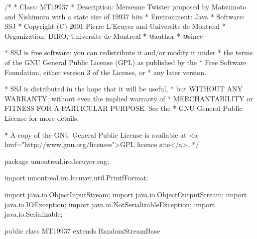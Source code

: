 \begin{code}
\begin{hide}
/*
 * Class:        MT19937
 * Description:  Mersenne Twister proposed by Matsumoto and Nishimura
                 with a state size of 19937 bits
 * Environment:  Java
 * Software:     SSJ
 * Copyright (C) 2001  Pierre L'Ecuyer and Universite de Montreal
 * Organization: DIRO, Universite de Montreal
 * @author
 * @since

 * SSJ is free software: you can redistribute it and/or modify it under
 * the terms of the GNU General Public License (GPL) as published by the
 * Free Software Foundation, either version 3 of the License, or
 * any later version.

 * SSJ is distributed in the hope that it will be useful,
 * but WITHOUT ANY WARRANTY; without even the implied warranty of
 * MERCHANTABILITY or FITNESS FOR A PARTICULAR PURPOSE.  See the
 * GNU General Public License for more details.

 * A copy of the GNU General Public License is available at
   <a href="http://www.gnu.org/licenses">GPL licence site</a>.
 */
\end{hide}
package umontreal.iro.lecuyer.rng;\begin{hide}

import umontreal.iro.lecuyer.util.PrintfFormat;

import java.io.ObjectInputStream;
import java.io.ObjectOutputStream;
import java.io.IOException;
import java.io.NotSerializableException;
import java.io.Serializable;\end{hide}

public class MT19937 extends RandomStreamBase \begin{hide} {

   private static final long serialVersionUID = 70510L;
   //La date de modification a l'envers, lire 10/05/2007

   private static final double NORM = 1.0 / 0x100000001L;   // 1/(2^32 + 1)

   private static final int N = 624;
   private static final int M = 397;
   private static final int[] MULT_MATRIX_A = {0x0, 0x9908B0DF};
   private static final int UPPER_MASK = 0x80000000;
   private static final int LOWER_MASK = 0x7FFFFFFF;

   private int[] state;
   private int state_i;

   private CloneableRandomStream seedRng;

   private void fillSeed() {
      state_i = N;

      for(int i = 0; i < N; i++)
         state[i] = (int)((long)(seedRng.nextDouble() * 0x100000000L));
   }
 \end{hide}
\end{code}

